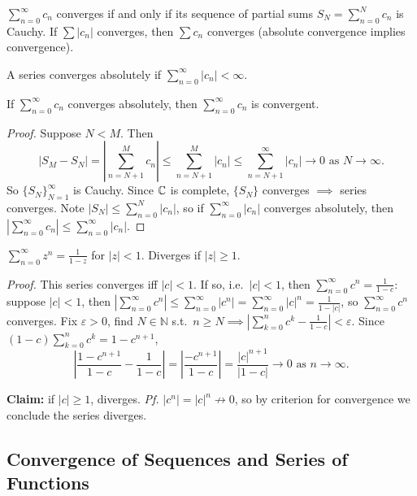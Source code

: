 \documentclass[11pt]{article}
\begin{document}
\begin{theorem}
$\sum_{n=0}^\infty c_n$ converges if and only if its sequence of partial sums $S_N = \sum_{n=0}^N c_n$ is Cauchy.
If $\sum |c_n|$ converges, then $\sum c_n$ converges (absolute convergence implies convergence).
\end{theorem}

\begin{definition}
A series converges absolutely if $\sum_{n=0}^\infty |c_n| < \infty$.
\end{definition}

\begin{lemma}
If $\sum_{n=0}^\infty c_n$ converges absolutely, then $\sum_{n=0}^\infty c_n$ is convergent.
\end{lemma}
\begin{proof}
Suppose $N < M$. Then
\[
|S_M - S_N| = \left|\sum_{n=N+1}^M c_n\right| \le \sum_{n=N+1}^M |c_n| \le \sum_{n=N+1}^\infty |c_n| \to 0 \text{ as } N \to \infty.
\]
So $\{S_N\}_{N=1}^\infty$ is Cauchy. Since ${\mathbb{C}}$ is complete, $\{S_N\}$ converges $\implies$ series converges. Note $|S_N| \le \sum_{n=0}^N |c_n|$, so if $\sum_{n=0}^\infty |c_n|$ converges absolutely, then $\left|\sum_{n=0}^\infty c_n\right| \le \sum_{n=0}^\infty |c_n|$.
\end{proof}

\begin{example}
$\sum_{n=0}^\infty z^n = \frac{1}{1-z}$ for $|z| < 1$. Diverges if $|z| \ge 1$.

\emph{Proof.} This series converges iff $|c| < 1$. If so, i.e.\ $|c| < 1$, then $\sum_{n=0}^\infty c^n = \frac{1}{1-c}$: suppose $|c| < 1$, then $\left|\sum_{n=0}^\infty c^n\right| \le \sum_{n=0}^\infty |c^n| = \sum_{n=0}^\infty |c|^n = \frac{1}{1-|c|}$, so $\sum_{n=0}^\infty c^n$ converges.
Fix $\varepsilon > 0$, find $N \in \mathbb{N}$ s.t.\ $n \ge N \implies \left|\sum_{k=0}^n c^k - \frac{1}{1-c}\right| < \varepsilon$. Since $(1-c)\sum_{k=0}^n c^k = 1-c^{n+1}$,
\[
\left|\frac{1-c^{n+1}}{1-c} - \frac{1}{1-c}\right| = \left|\frac{-c^{n+1}}{1-c}\right| = \frac{|c|^{n+1}}{|1-c|} \to 0 \text{ as } n \to \infty.
\]

\textbf{Claim:} if $|c| \ge 1$, diverges. \emph{Pf.} $|c^n| = |c|^n \not\to 0$, so by criterion for convergence we conclude the series diverges.
\end{example}

\subsection{Convergence of Sequences and Series of Functions}
\end{document}

